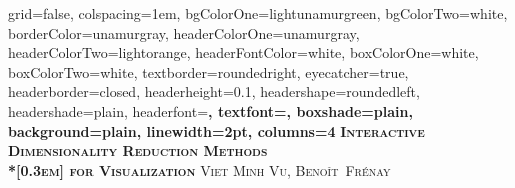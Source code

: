 \documentclass[portrait,final,a0paper]{nadiposter}
\begin{document}







\begin{poster}%
  {
  grid=false,
  colspacing=1em,
  bgColorOne=lightunamurgreen,
  bgColorTwo=white,
  borderColor=unamurgray,
  headerColorOne=unamurgray,
  headerColorTwo=lightorange,
  headerFontColor=white,
  boxColorOne=white,
  boxColorTwo=white,
  textborder=roundedright,
  eyecatcher=true,
  headerborder=closed,
  headerheight=0.1\textheight,
  headershape=roundedleft,
  headershade=plain,
  headerfont=\Large\bf\textsc, %
  textfont={\setlength{\parindent}{1.5em}},
  boxshade=plain,
  background=plain,
  linewidth=2pt,
  columns=4
  }
  {\hbox{} } %
  {\bf\textsc{Interactive Dimensionality Reduction Methods\\*[0.3em] for Visualization}\vspace{0.5em}}
  {\textsc{Viet Minh Vu, Beno\^it~Fr\'enay} } %
  {%
   \hbox{} %
  }



\sectionfont{\centering}



\end{poster}
\end{document}
